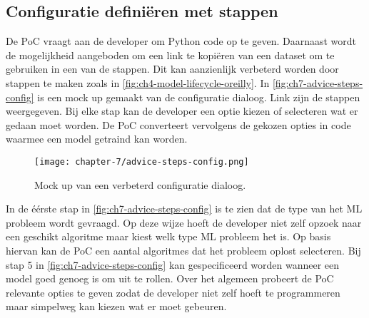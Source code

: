 
\subsection{Configuratie definiëren met stappen}\label{subsec:ch7-configuratie-definieren-met-stappen}
De PoC vraagt aan de developer om Python code op te geven. Daarnaast wordt de mogelijkheid aangeboden om een link te kopiëren van een dataset om te gebruiken in een van de stappen. Dit kan aanzienlijk verbeterd worden door stappen te maken zoals in \autoref{fig:ch4-model-lifecycle-oreilly}. In \autoref{fig:ch7-advice-steps-config} is een mock up gemaakt van de configuratie dialoog. Link zijn de stappen weergegeven. Bij elke stap kan de developer een optie kiezen of selecteren wat er gedaan moet worden. De PoC converteert vervolgens de gekozen opties in code waarmee een model getraind kan worden.

\newpage

\begin{figure}[hbt!]
  \centering
  \texttt{[image: chapter-7/advice-steps-config.png]}
  \caption{Mock up van een verbeterd configuratie dialoog.}
  \label{fig:ch7-advice-steps-config}
\end{figure}

In de éérste stap in \autoref{fig:ch7-advice-steps-config} is te zien dat de type van het ML probleem wordt gevraagd. Op deze wijze hoeft de developer niet zelf opzoek naar een geschikt algoritme maar kiest welk type ML probleem het is. Op basis hiervan kan de PoC een aantal algoritmes dat het probleem oplost selecteren. Bij stap 5 in \autoref{fig:ch7-advice-steps-config} kan gespecificeerd worden wanneer een model goed genoeg is om uit te rollen. Over het algemeen probeert de PoC relevante opties te geven zodat de developer niet zelf hoeft te programmeren maar simpelweg kan kiezen wat er moet gebeuren.